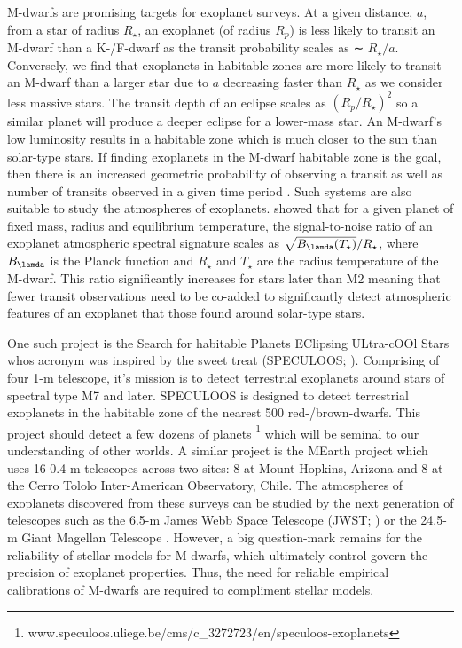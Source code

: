 M-dwarfs are promising targets for exoplanet surveys. At a given distance, $a$, from a star of radius $R_\star$, an exoplanet (of radius $R_p$) is less likely to transit an M-dwarf than a K-/F-dwarf as the transit probability scales as ∼ $R_\star /a$. Conversely, we find that exoplanets in habitable zones are more likely to transit an M-dwarf than a larger star due to $a$ decreasing faster than $R_\star$ as we consider less massive stars. The transit depth of an eclipse scales as $(R_p/R_\star)^2$ so a similar planet will produce a deeper eclipse for a lower-mass star. An M-dwarf's low luminosity results in a habitable zone which is much closer to the sun than solar-type stars. If finding exoplanets in the M-dwarf habitable zone is the goal, then there is an increased geometric probability of observing a transit as well as number of transits observed in a given time period \citep{2008PASP..120..317N}. Such systems are also suitable to study the atmospheres of exoplanets. \citet{2013Sci...342.1473D} showed that for a given planet of fixed mass, radius and equilibrium temperature, the signal-to-noise ratio of an exoplanet atmospheric spectral signature scales as $\sqrt{B_\lamda (T_\star)} / R_\star$, where $B_\lamda$ is the Planck function and $R_\star$ and $T_\star$ are the radius temperature of the M-dwarf. This ratio significantly increases for stars later than M2 meaning that fewer transit observations need to be co-added to significantly detect atmospheric features of an exoplanet that those found around solar-type stars. 

One such project is the Search for habitable Planets EClipsing ULtra-cOOl Stars whos acronym was inspired by the sweet treat (SPECULOOS; \citealt{2018SPIE10700E..1ID}). Comprising of four 1-m telescope, it's mission is to detect terrestrial exoplanets around stars of spectral type M7 and later. SPECULOOS is designed to detect terrestrial exoplanets in the habitable zone of the nearest 500 red-/brown-dwarfs. This project should detect a few dozens of planets
%
\footnote{www.speculoos.uliege.be/cms/c_3272723/en/speculoos-exoplanets}
%
which will be seminal to our understanding of other worlds. A similar project is the MEarth project \citep{2010ApJ...718.1353I} which uses 16 0.4-m telescopes across two sites: 8 at Mount Hopkins, Arizona and 8 at the Cerro Tololo Inter-American Observatory, Chile. The atmospheres of exoplanets discovered from these surveys can be studied by the next generation of telescopes such as the 6.5-m James Webb Space Telescope (JWST; \citealt{2006SSRv..123..485G}) or the 24.5-m Giant Magellan Telescope \citep{2014SPIE.9145E..1CB}. However, a big question-mark remains for the reliability of stellar models for M-dwarfs, which ultimately control govern the precision of exoplanet properties. Thus, the need for reliable empirical calibrations of M-dwarfs are required to compliment stellar models. 

